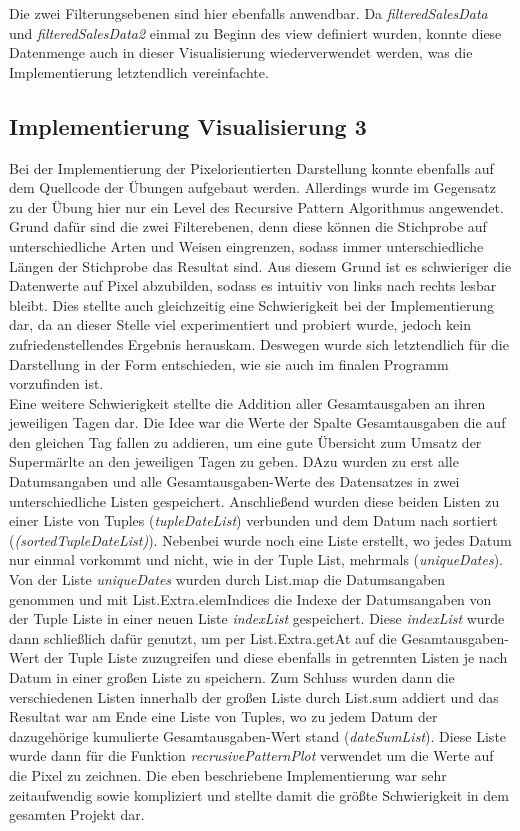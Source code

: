 \documentclass[usegeometry=true]{scrartcl}
\begin{document}
\noindent Die zwei Filterungsebenen sind hier ebenfalls anwendbar. Da \textit{filteredSalesData} und \textit{filteredSalesData2} einmal zu Beginn des view definiert wurden,
konnte diese Datenmenge auch in dieser Visualisierung wiederverwendet werden, was die Implementierung letztendlich vereinfachte.

\subsection{Implementierung Visualisierung 3}
Bei der Implementierung der Pixelorientierten Darstellung konnte ebenfalls auf dem Quellcode der Übungen aufgebaut werden. Allerdings wurde im Gegensatz zu der Übung hier nur
ein Level des Recursive Pattern Algorithmus angewendet. Grund dafür sind die zwei Filterebenen, denn diese können die Stichprobe auf unterschiedliche Arten und Weisen eingrenzen,
sodass immer unterschiedliche Längen der Stichprobe das Resultat sind. Aus diesem Grund ist es schwieriger die Datenwerte auf Pixel abzubilden, sodass es intuitiv von links nach
rechts lesbar bleibt. Dies stellte auch gleichzeitig eine Schwierigkeit bei der Implementierung dar, da an dieser Stelle viel experimentiert und probiert wurde, jedoch kein
zufriedenstellendes Ergebnis herauskam. Deswegen wurde sich letztendlich für die Darstellung in der Form entschieden, wie sie auch im finalen Programm vorzufinden ist.\\

\noindent Eine weitere Schwierigkeit stellte die Addition aller Gesamtausgaben an ihren jeweiligen Tagen dar. Die Idee war die Werte der Spalte Gesamtausgaben die auf den gleichen Tag fallen
zu addieren, um eine gute Übersicht zum Umsatz der Supermärlte an den jeweiligen Tagen zu geben. DAzu wurden zu erst alle Datumsangaben und alle Gesamtausgaben-Werte des Datensatzes
in zwei unterschiedliche Listen gespeichert. Anschließend wurden diese beiden Listen zu einer Liste von Tuples (\textit{tupleDateList}) verbunden und dem Datum nach sortiert
(\textit{(\textit{sortedTupleDateList})}). Nebenbei wurde noch eine Liste erstellt, wo jedes Datum nur einmal vorkommt und nicht, wie in der Tuple List, mehrmals
(\textit{uniqueDates}). Von der Liste \textit{uniqueDates} wurden durch List.map die Datumsangaben genommen und mit List.Extra.elemIndices die Indexe der Datumsangaben von der
Tuple Liste in einer neuen Liste \textit{indexList} gespeichert. Diese \textit{indexList} wurde dann schließlich dafür genutzt, um per List.Extra.getAt auf die Gesamtausgaben-Wert
der Tuple Liste zuzugreifen und diese ebenfalls in getrennten Listen je nach Datum in einer großen Liste zu speichern. Zum Schluss wurden dann die verschiedenen Listen innerhalb
der großen Liste durch List.sum addiert und das Resultat war am Ende eine Liste von Tuples, wo zu jedem Datum der dazugehörige kumulierte Gesamtausgaben-Wert stand
(\textit{dateSumList}). Diese Liste wurde dann für die Funktion \textit{recrusivePatternPlot} verwendet um die Werte auf die Pixel zu zeichnen. Die eben beschriebene Implementierung
war sehr zeitaufwendig sowie kompliziert und stellte damit die größte Schwierigkeit in dem gesamten Projekt dar.
\end{document}
